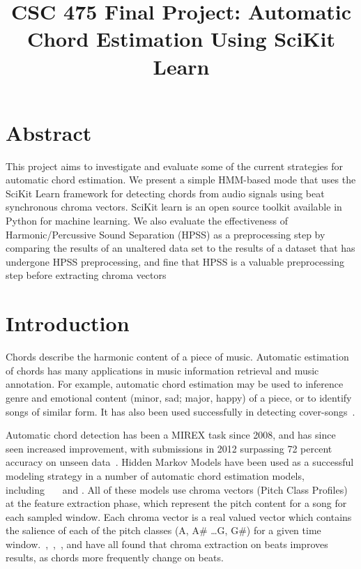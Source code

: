 \documentclass{article}
\title{CSC 475 Final Project: Automatic Chord Estimation Using SciKit Learn}
\begin{document}
%
\maketitle
%


\section{Abstract}\label{sec:desoutline}
This project aims to investigate and evaluate some of the current strategies
for automatic chord estimation. We present a simple HMM-based mode that uses
the SciKit Learn framework for detecting chords from audio signals using beat
synchronous chroma vectors.  SciKit learn is an open source toolkit available
in Python for machine learning. We also evaluate the effectiveness of
Harmonic/Percussive Sound Separation (HPSS) as a preprocessing step by
comparing the results of an unaltered data set to the results of a dataset that
has undergone HPSS preprocessing, and fine that HPSS is a valuable
preprocessing step before extracting chroma vectors

\section{Introduction}\label{sec:intro}

Chords describe the harmonic content of a piece of music. Automatic estimation
of chords has many applications in music information retrieval and music
annotation. For example, automatic chord estimation may be used to inference
genre and emotional content (minor, sad; major, happy) of a piece, or to
identify songs of similar form.  It has also been used successfully in
detecting cover-songs~\cite{Papadopoulos:18}.

Automatic chord detection has been a MIREX task since 2008, and has since seen
increased improvement, with submissions in 2012 surpassing 72 percent accuracy
on unseen data~\cite{McVicar:00}. Hidden Markov Models have been used as a
successful modeling strategy in a number of automatic chord estimation models,
including~\cite{Ueda:01}~\cite{Lee:15}~\cite{Ueda:19} and
\cite{Papadopoulos:18}. All of these models use chroma vectors (Pitch Class
Profiles) at the feature extraction phase, which represent the pitch content
for a song for each sampled window. Each chroma vector is a real valued vector
which contains the salience of each of the pitch classes (A, A\# \dots G, G\#) for a
given time window.~\cite{McVicar:00},~\cite{Lee:15},~\cite{Papadopoulos:18},
and\cite{Zenz:20} have all found that chroma extraction on beats improves
results, as chords more frequently change on beats.
\end{document}
